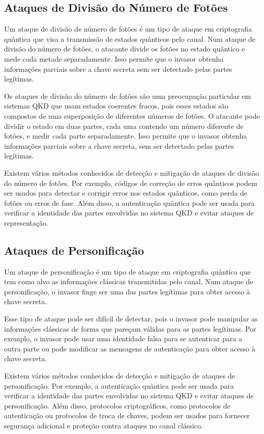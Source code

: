 \subsection{Ataques de Divisão do Número de Fotões}

Um ataque de divisão de número de fotões é um tipo de ataque em criptografia quântica que visa a transmissão de estados quânticos pelo canal. Num ataque de divisão do número de fotões, o atacante divide os fotões no estado quântico e mede cada metade separadamente. Isso permite que o invasor obtenha informações parciais sobre a chave secreta sem ser detectado pelas partes legítimas.

Os ataques de divisão do número de fotões são uma preocupação particular em sistemas QKD que usam estados coerentes fracos, pois esses estados são compostos de uma superposição de diferentes números de fotões. O atacante pode dividir o estado em duas partes, cada uma contendo um número diferente de fotões, e medir cada parte separadamente. Isso permite que o invasor obtenha informações parciais sobre a chave secreta, sem ser detectado pelas partes legítimas.

Existem vários métodos conhecidos de detecção e mitigação de ataques de divisão do número de fotões. Por exemplo, códigos de correção de erros quânticos podem ser usados para detectar e corrigir erros nos estados quânticos, como perda de fotões ou erros de fase. Além disso, a autenticação quântica pode ser usada para verificar a identidade das partes envolvidas no sistema QKD e evitar ataques de representação.

\subsection{Ataques de Personificação}

Um ataque de personificação é um tipo de ataque em criptografia quântica que tem como alvo as informações clássicas transmitidas pelo canal. Num ataque de personificação, o invasor finge ser uma das partes legítimas para obter acesso à chave secreta.

Esse tipo de ataque pode ser difícil de detectar, pois o invasor pode manipular as informações clássicas de forma que pareçam válidas para as partes legítimas. Por exemplo, o invasor pode usar uma identidade falsa para se autenticar para a outra parte ou pode modificar as mensagens de autenticação para obter acesso à chave secreta.

Existem vários métodos conhecidos de detecção e mitigação de ataques de personificação. Por exemplo, a autenticação quântica pode ser usada para verificar a identidade das partes envolvidas no sistema QKD e evitar ataques de personificação. Além disso, protocolos criptográficos, como protocolos de autenticação ou protocolos de troca de chaves, podem ser usados para fornecer segurança adicional e proteção contra ataques no canal clássico.

